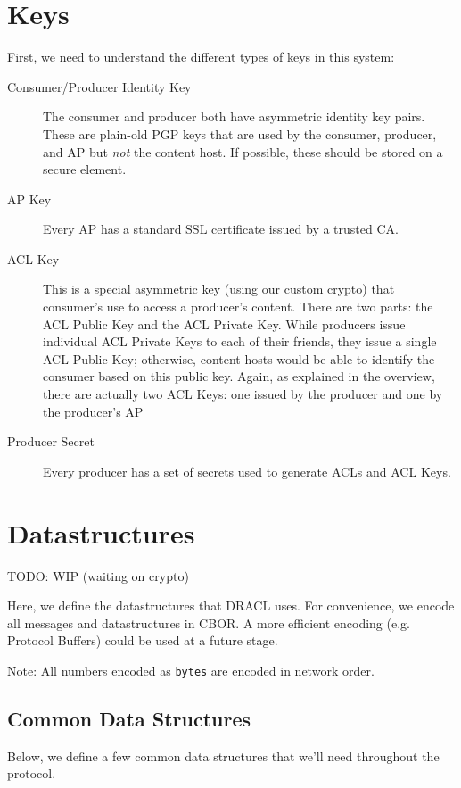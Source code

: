 \documentclass[pdftex,12pt,a4papaer,twoside,notitlepage]{report}
\begin{document}
\section{Keys}

First, we need to understand the different types of keys in this system:

\begin{description}
\item[Consumer/Producer Identity Key] The consumer and producer both have
  asymmetric identity key pairs. These are plain-old PGP keys that are used by
  the consumer, producer, and AP but \emph{not} the content host. If possible,
  these should be stored on a secure element.
\item[AP Key] Every AP has a standard SSL certificate issued by a trusted CA.
\item[ACL Key] This is a special asymmetric key (using our custom crypto) that
  consumer's use to access a producer's content. There are two parts: the ACL
  Public Key and the ACL Private Key. While producers issue individual ACL
  Private Keys to each of their friends, they issue a single ACL Public Key;
  otherwise, content hosts would be able to identify the consumer based on this
  public key. Again, as explained in the overview, there are actually two ACL
  Keys: one issued by the producer and one by the producer's AP
\item[Producer Secret] Every producer has a set of secrets used to generate ACLs
  and ACL Keys.
\end{description}

\section{Datastructures}

TODO: WIP (waiting on crypto)

Here, we define the datastructures that DRACL uses. For convenience, we encode
all messages and datastructures in CBOR. A more efficient encoding (e.g.
Protocol Buffers) could be used at a future stage.

Note: All numbers encoded as \texttt{bytes} are encoded in network order.

\subsection{Common Data Structures}

Below, we define a few common data structures that we'll need throughout the
protocol.
\end{document}
